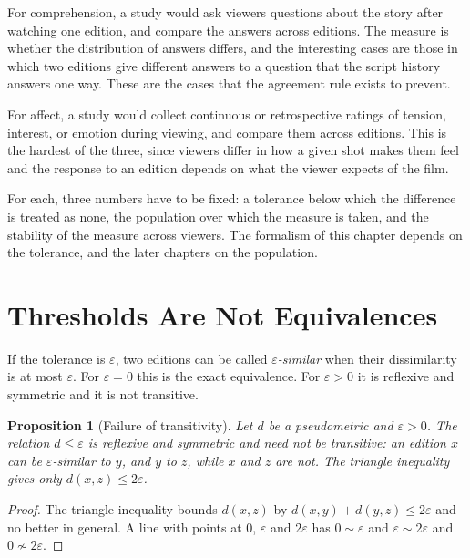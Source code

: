 \documentclass[11pt,twoside,openright]{book}
\theoremstyle{plain}
\newtheorem{proposition}[theorem]{Proposition}
\theoremstyle{definition}
\theoremstyle{remark}
\begin{document}
For comprehension, a study would ask viewers questions about the story after watching one edition, and compare the answers across editions. The measure is whether the distribution of answers differs, and the interesting cases are those in which two editions give different answers to a question that the script history answers one way. These are the cases that the agreement rule exists to prevent.

For affect, a study would collect continuous or retrospective ratings of tension, interest, or emotion during viewing, and compare them across editions. This is the hardest of the three, since viewers differ in how a given shot makes them feel and the response to an edition depends on what the viewer expects of the film.

For each, three numbers have to be fixed: a tolerance below which the difference is treated as none, the population over which the measure is taken, and the stability of the measure across viewers. The formalism of this chapter depends on the tolerance, and the later chapters on the population.

\section{Thresholds Are Not Equivalences}\label{sec:thresholds}

If the tolerance is $\varepsilon$, two editions can be called \emph{$\varepsilon$-similar} when their dissimilarity is at most $\varepsilon$. For $\varepsilon=0$ this is the exact equivalence. For $\varepsilon>0$ it is reflexive and symmetric and it is not transitive.

\begin{proposition}[Failure of transitivity]\label{prop:transitivity}
Let $d$ be a pseudometric and $\varepsilon>0$. The relation $d\le\varepsilon$ is reflexive and symmetric and need not be transitive: an edition $x$ can be $\varepsilon$-similar to $y$, and $y$ to $z$, while $x$ and $z$ are not. The triangle inequality gives only $d(x,z)\le2\varepsilon$.
\end{proposition}

\begin{proof}
The triangle inequality bounds $d(x,z)$ by $d(x,y)+d(y,z)\le2\varepsilon$ and no better in general. A line with points at $0$, $\varepsilon$ and $2\varepsilon$ has $0\sim\varepsilon$ and $\varepsilon\sim2\varepsilon$ and $0\not\sim2\varepsilon$.
\end{proof}
\end{document}
